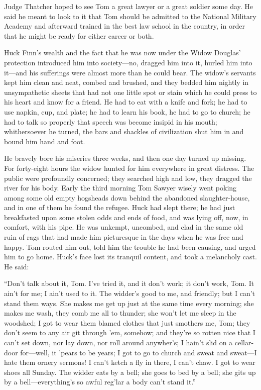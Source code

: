 \documentclass{book}
\begin{document}
Judge Thatcher hoped to see Tom a great lawyer or a great soldier some day. He said he meant to look to it that Tom should be admitted to the National Military Academy and afterward trained in the best law school in the country, in order that he might be ready for either career or both.

Huck Finn’s wealth and the fact that he was now under the Widow Douglas’ protection introduced him into society—no, dragged him into it, hurled him into it—and his sufferings were almost more than he could bear. The widow’s servants kept him clean and neat, combed and brushed, and they bedded him nightly in unsympathetic sheets that had not one little spot or stain which he could press to his heart and know for a friend. He had to eat with a knife and fork; he had to use napkin, cup, and plate; he had to learn his book, he had to go to church; he had to talk so properly that speech was become insipid in his mouth; whithersoever he turned, the bars and shackles of civilization shut him in and bound him hand and foot.

He bravely bore his miseries three weeks, and then one day turned up missing. For forty-eight hours the widow hunted for him everywhere in great distress. The public were profoundly concerned; they searched high and low, they dragged the river for his body. Early the third morning Tom Sawyer wisely went poking among some old empty hogsheads down behind the abandoned slaughter-house, and in one of them he found the refugee. Huck had slept there; he had just breakfasted upon some stolen odds and ends of food, and was lying off, now, in comfort, with his pipe. He was unkempt, uncombed, and clad in the same old ruin of rags that had made him picturesque in the days when he was free and happy. Tom routed him out, told him the trouble he had been causing, and urged him to go home. Huck’s face lost its tranquil content, and took a melancholy cast. He said:

“Don’t talk about it, Tom. I’ve tried it, and it don’t work; it don’t work, Tom. It ain’t for me; I ain’t used to it. The widder’s good to me, and friendly; but I can’t stand them ways. She makes me get up just at the same time every morning; she makes me wash, they comb me all to thunder; she won’t let me sleep in the woodshed; I got to wear them blamed clothes that just smothers me, Tom; they don’t seem to any air git through ’em, somehow; and they’re so rotten nice that I can’t set down, nor lay down, nor roll around anywher’s; I hain’t slid on a cellar-door for—well, it ’pears to be years; I got to go to church and sweat and sweat—I hate them ornery sermons! I can’t ketch a fly in there, I can’t chaw. I got to wear shoes all Sunday. The widder eats by a bell; she goes to bed by a bell; she gits up by a bell—everything’s so awful reg’lar a body can’t stand it.”
\end{document}
